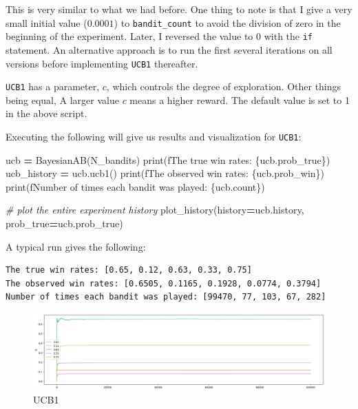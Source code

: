 \documentclass[
]{book}
\newenvironment{Shaded}{\begin{snugshade}}{\end{snugshade}}
\newcommand{\BuiltInTok}[1]{#1}
\newcommand{\CommentTok}[1]{\textcolor[rgb]{0.56,0.35,0.01}{\textit{#1}}}
\newcommand{\NormalTok}[1]{#1}
\newcommand{\OperatorTok}[1]{\textcolor[rgb]{0.81,0.36,0.00}{\textbf{#1}}}
\newcommand{\SpecialCharTok}[1]{\textcolor[rgb]{0.00,0.00,0.00}{#1}}
\newcommand{\SpecialStringTok}[1]{\textcolor[rgb]{0.31,0.60,0.02}{#1}}
\theoremstyle{definition}
\theoremstyle{definition}
\theoremstyle{definition}
\theoremstyle{definition}
\theoremstyle{remark}
\begin{document}
This is very similar to what we had before. One thing to note is that I give a very small initial value (\(0.0001\)) to \texttt{bandit\_count} to avoid the division of zero in the beginning of the experiment. Later, I reversed the value to 0 with the \texttt{if} statement. An alternative approach is to run the first several iterations on all versions before implementing \texttt{UCB1} thereafter.

\texttt{UCB1} has a parameter, \(c\), which controls the degree of exploration. Other things being equal, A larger value \(c\) means a higher reward. The default value is set to 1 in the above script.

Executing the following will give us results and visualization for \texttt{UCB1}:

\begin{Shaded}
\begin{Highlighting}[]
\NormalTok{ucb }\OperatorTok{=}\NormalTok{ BayesianAB(N\_bandits)}
\BuiltInTok{print}\NormalTok{(}\SpecialStringTok{f\textquotesingle{}The true win rates: }\SpecialCharTok{\{}\NormalTok{ucb}\SpecialCharTok{.}\NormalTok{prob\_true}\SpecialCharTok{\}}\SpecialStringTok{\textquotesingle{}}\NormalTok{)}
\NormalTok{ucb\_history }\OperatorTok{=}\NormalTok{ ucb.ucb1()}
\BuiltInTok{print}\NormalTok{(}\SpecialStringTok{f\textquotesingle{}The observed win rates: }\SpecialCharTok{\{}\NormalTok{ucb}\SpecialCharTok{.}\NormalTok{prob\_win}\SpecialCharTok{\}}\SpecialStringTok{\textquotesingle{}}\NormalTok{)}
\BuiltInTok{print}\NormalTok{(}\SpecialStringTok{f\textquotesingle{}Number of times each bandit was played: }\SpecialCharTok{\{}\NormalTok{ucb}\SpecialCharTok{.}\NormalTok{count}\SpecialCharTok{\}}\SpecialStringTok{\textquotesingle{}}\NormalTok{)}

\CommentTok{\# plot the entire experiment history}
\NormalTok{plot\_history(history}\OperatorTok{=}\NormalTok{ucb.history, prob\_true}\OperatorTok{=}\NormalTok{ucb.prob\_true)}
\end{Highlighting}
\end{Shaded}

A typical run gives the following:

\begin{verbatim}
The true win rates: [0.65, 0.12, 0.63, 0.33, 0.75]
The observed win rates: [0.6505, 0.1165, 0.1928, 0.0774, 0.3794]
Number of times each bandit was played: [99470, 77, 103, 67, 282]
\end{verbatim}

\begin{figure}
\centering
\includegraphics{images/ucb1.png}
\caption{UCB1}
\end{figure}
\end{document}
